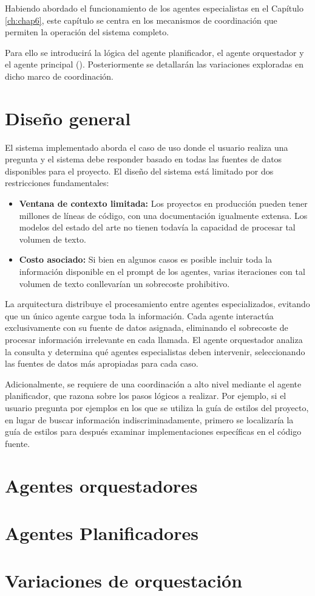 Habiendo abordado el funcionamiento de los agentes especialistas en el Capítulo \ref{ch:chap6}, este capítulo se centra en los mecanismos de coordinación que permiten la operación del sistema completo.  

Para ello se introducirá la lógica del agente planificador, el agente orquestador y el agente principal (). Posteriormente se detallarán las variaciones exploradas en dicho marco de coordinación. 

\section{Diseño general}
El sistema implementado aborda el caso de uso donde el usuario realiza una pregunta y el sistema debe responder basado en todas las fuentes de datos disponibles para el proyecto. El diseño del sistema está limitado por dos restricciones fundamentales: 
\begin{itemize}
  \item\textbf{Ventana de contexto limitada: }Los proyectos en producción pueden tener millones de líneas de código, con una documentación igualmente extensa. Los modelos del estado del arte no tienen todavía la capacidad de procesar tal volumen de texto. 
  \item\textbf{Costo asociado: }Si bien en algunos casos es posible incluir toda la información disponible en el prompt de los agentes, varias iteraciones con tal volumen de texto conllevarían un sobrecoste prohibitivo. 
\end{itemize}
La arquitectura distribuye el procesamiento entre agentes especializados, evitando que un único agente cargue toda la información. Cada agente interactúa exclusivamente con su fuente de datos asignada, eliminando el sobrecoste de procesar información irrelevante en cada llamada. El agente orquestador analiza la consulta y determina qué agentes especialistas deben intervenir, seleccionando las fuentes de datos más apropiadas para cada caso.

Adicionalmente, se requiere de una coordinación a alto nivel mediante el agente planificador, que razona sobre los pasos lógicos a realizar. Por ejemplo, si el usuario pregunta por ejemplos en los que se utiliza la guía de estilos del proyecto, en lugar de buscar información indiscriminadamente, primero se localizaría la guía de estilos para después examinar implementaciones específicas en el código fuente. 

\section{Agentes orquestadores}

\section{Agentes Planificadores}

\section{Variaciones de orquestación}
